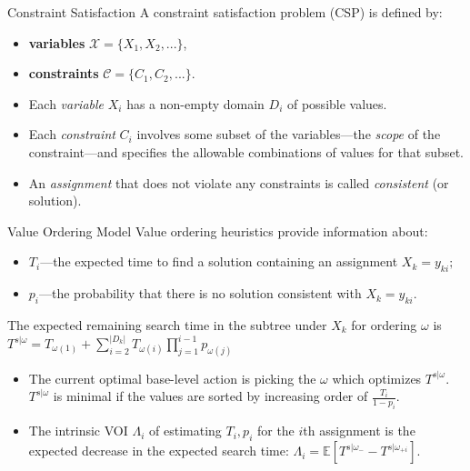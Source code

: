 \documentclass{beamer}
\begin{document}
\begin{frame}{Constraint Satisfaction}
A constraint satisfaction problem (CSP) is defined by:
\begin{itemize}
\item[] {\bf variables} $\mathcal{X}=\{X_1, X_2, ...\}$, 
\item[] {\bf constraints} $\mathcal{C}=\{C_1, C_2, ...\}$. 
\end{itemize}
\begin{itemize}
 \item Each {\it variable} $X_i$ has a non-empty domain
          $D_i$ of possible values. 
\item Each {\it constraint} $C_i$ involves some subset
          of the variables---the {\it scope} of the constraint---and specifies the
          allowable combinations of values for that subset. 
\item An {\it assignment} that does not violate any constraints is called
          {\it consistent} (or solution).
 \end{itemize}
 \end{frame}

\begin{frame}{Value Ordering Model}
Value ordering heuristics provide information about:
\begin{itemize}
 \item $T_i$---the expected time to find a solution containing
          an assignment  $X_k=y_{ki};$
\item $p_i$---the probability that there is no solution
  consistent with $X_k=y_{ki}$.
\end{itemize}
The expected remaining search time in the subtree under $X_k$ for
ordering $\omega$ is $T^{s|\omega}=T_{\omega(1)}+\sum_{i=2}^{|D_k|}T_{\omega(i)}\prod_{j=1}^{i-1}p_{\omega(j)}$
\begin{itemize}
\item The current optimal base-level action is picking the $\omega $ which optimizes $T^{s|\omega}$.  $T^{s|\omega}$ is minimal if the values are sorted  by increasing order of $\frac {T_i} {1-p_i}$.
\item The intrinsic VOI $\Lambda_i$ of estimating $T_i, p_i$ for the $i$th assignment is the expected decrease in the expected search time:
          $\Lambda_i=\mathbb{E}\left[T^{s|\omega_-}-T^{s|\omega_{+i}}\right]$.
\end{itemize}
\end{frame}
\end{document}
